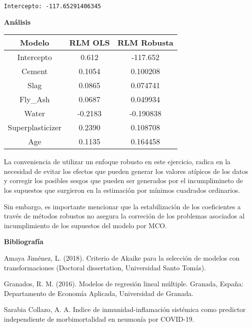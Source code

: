 \documentclass[11pt]{article}
\begin{document}
    \begin{Verbatim}[commandchars=\\\{\}]
Intercepto: -117.65291406345
    \end{Verbatim}

    \textbf{Análisis}

    \begin{longtable}[]{@{}ccc@{}}
\toprule\noalign{}
Modelo & RLM OLS & RLM Robusta \\
\midrule\noalign{}
\endhead
\bottomrule\noalign{}
\endlastfoot
Intercepto & 0.612 & -117.652 \\
Cement & 0.1054 & 0.100208 \\
Slag & 0.0865 & 0.074741 \\
Fly\_Ash & 0.0687 & 0.049934 \\
Water & -0.2183 & -0.190838 \\
Superplasticizer & 0.2390 & 0.108708 \\
Age & 0.1135 & 0.164458 \\
\end{longtable}

La conveniencia de utilizar un enfoque robusto en este ejercicio, radica
en la necesidad de evitar los efectos que pueden generar los valores
atípicos de los datos y corregir los posibles sesgos que pueden ser
generados por el incumplimineto de los supuestos que surgieron en la
estimación por mínimos cuadrados ordinarios.

Sin embargo, es importante mencionar que la estabilización de los
coeficientes a través de métodos robustos no asegura la correción de los
problemas asociados al incumplimiento de los supuestos del modelo por
MCO.

    \textbf{Bibliografía}

Amaya Jiménez, L. (2018). Criterio de Akaike para la selección de
modelos con transformaciones (Doctoral dissertation, Universidad Santo
Tomás).

Granados, R. M. (2016). Modelos de regresión lineal múltiple. Granada,
España: Departamento de Economía Aplicada, Universidad de Granada.

Sarabia Collazo, A. A. Indice de inmunidad-inflamación sistémica como
predictor independiente de morbimortalidad en neumonía por COVID-19.


    
    
    
\end{document}
